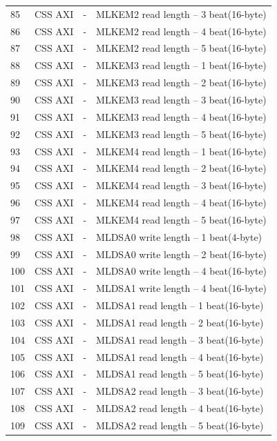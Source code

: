 \begin{center}
\begin{longtable}{|l|l|l|l|}
85  & CSS AXI &  -     &  MLKEM2 read  length -- 3 beat(16-byte)\\
86  & CSS AXI &  -     &  MLKEM2 read  length -- 4 beat(16-byte)\\
87  & CSS AXI &  -     &  MLKEM2 read  length -- 5 beat(16-byte)\\
88  & CSS AXI &  -     &  MLKEM3 read  length -- 1 beat(16-byte)\\
89  & CSS AXI &  -     &  MLKEM3 read  length -- 2 beat(16-byte)\\
90  & CSS AXI &  -     &  MLKEM3 read  length -- 3 beat(16-byte)\\
91  & CSS AXI &  -     &  MLKEM3 read  length -- 4 beat(16-byte)\\
92  & CSS AXI &  -     &  MLKEM3 read  length -- 5 beat(16-byte)\\
93  & CSS AXI &  -     &  MLKEM4 read  length -- 1 beat(16-byte)\\
94  & CSS AXI &  -     &  MLKEM4 read  length -- 2 beat(16-byte)\\
95  & CSS AXI &  -     &  MLKEM4 read  length -- 3 beat(16-byte)\\
96  & CSS AXI &  -     &  MLKEM4 read  length -- 4 beat(16-byte)\\
97  & CSS AXI &  -     &  MLKEM4 read  length -- 5 beat(16-byte)\\
98  & CSS AXI &  -     &  MLDSA0 write length -- 1 beat(4-byte)\\
99  & CSS AXI &  -     &  MLDSA0 write length -- 2 beat(16-byte)\\
100 & CSS AXI &  -     &  MLDSA0 write length -- 4 beat(16-byte)\\
101 & CSS AXI &  -     &  MLDSA1 write length -- 4 beat(16-byte)\\
102 & CSS AXI &  -     &  MLDSA1 read  length -- 1 beat(16-byte)\\
103 & CSS AXI &  -     &  MLDSA1 read  length -- 2 beat(16-byte)\\
104 & CSS AXI &  -     &  MLDSA1 read  length -- 3 beat(16-byte)\\
105 & CSS AXI &  -     &  MLDSA1 read  length -- 4 beat(16-byte)\\
106 & CSS AXI &  -     &  MLDSA1 read  length -- 5 beat(16-byte)\\
107 & CSS AXI &  -     &  MLDSA2 read  length -- 3 beat(16-byte)\\
108 & CSS AXI &  -     &  MLDSA2 read  length -- 4 beat(16-byte)\\
109 & CSS AXI &  -     &  MLDSA2 read  length -- 5 beat(16-byte)\\

\end{longtable}
\end{center}
